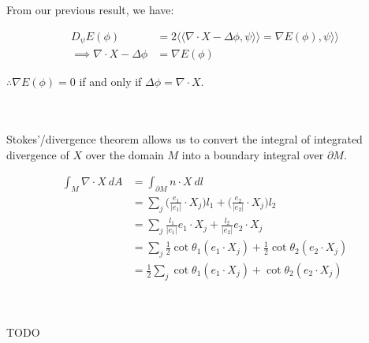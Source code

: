 \documentclass{article}
\newcommand\ifrac[2]{{\displaystyle\frac{#1}{#2}}}
\def\grad{\nabla}
\def\lap{\Delta}
\def\hal{\ifrac{1}{2}}
\def\ll{\langle\langle}
\def\rr{\rangle\rangle}
\begin{document}
\vspace{1.8cm}
\\\\


From our previous result, we have:

\begin{align*}
    D_\psi E(\phi) &= 2 \ll \grad \cdot X - \lap \phi, \psi \rr = \grad E(\phi), \psi \rr \\
    \implies \grad \cdot X - \lap \phi &= \grad E(\phi)
\end{align*}

$\therefore \grad E(\phi) = 0$ if and only if $\lap \phi = \grad \cdot X$.


\pagebreak
{}\\\\


Stokes'/divergence theorem allows us to convert the integral of integrated divergence of $X$ over the domain $M$
into a boundary integral over $\partial M$.

\begin{align*}
    \int_M \nabla \cdot X \ dA &= \int_{\partial M} n \cdot X \ dl \\
        &= \sum_{j} \Big(\frac{e_1}{| e_1 |} \cdot X_j \Big) l_1 +\Big(\frac{e_2}{| e_2 |} \cdot X_j \Big) l_2 \\
        &= \sum_{j} \frac{l_1}{| e_1 |} e_1 \cdot X_j + \frac{l_2}{| e_2 |} e_2 \cdot X_j \\
        &= \sum_{j} \hal \cot{\theta_1} (e_1 \cdot X_j) + \hal \cot{\theta_2} (e_2 \cdot X_j) \\
        &= \hal \sum_{j} \cot{\theta_1} (e_1 \cdot X_j) + \cot{\theta_2} (e_2 \cdot X_j)
\end{align*}


\vspace{1.8cm}
\\\\
TODO
\end{document}
